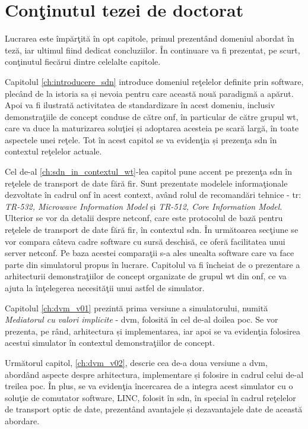 \section{Conţinutul tezei de doctorat}

Lucrarea este împărţită în opt capitole, primul prezentând domeniul abordat în teză, iar ultimul fiind dedicat concluziilor. În continuare va fi prezentat, pe scurt, conţinutul fiecărui dintre celelalte capitole.

Capitolul \ref{ch:introducere_sdn} introduce domeniul reţelelor definite prin software, plecând de la istoria sa și nevoia pentru care această nouă paradigmă a apărut. Apoi va fi ilustrată activitatea de standardizare în acest domeniu, inclusiv demonstraţiile de concept conduse de către \gls{onf}, în particular de către grupul \gls{wt}, care va duce la maturizarea soluţiei și adoptarea acesteia pe scară largă, în toate aspectele unei reţele. Tot în acest capitol se va evidenţia și prezenţa \gls{sdn} în contextul reţelelor actuale.

Cel de-al \ref{ch:sdn_in_contextul_wt}-lea capitol pune accent pe prezenţa \gls{sdn} în reţelele de transport de date fără fir. Sunt prezentate modelele informaţionale dezvoltate în cadrul \gls{onf} în acest context, având rolul de recomandări tehnice - \gls{tr}: \textit{TR-532, Microwave Information Model} și \textit{TR-512, Core Information Model}. Ulterior se vor da detalii despre \gls{netconf}, care este protocolul de bază pentru reţelele de transport de date fără fir, în contextul \gls{sdn}. În următoarea secţiune se vor compara câteva cadre software cu sursă deschisă, ce oferă facilitatea unui server \gls{netconf}. Pe baza acestei comparaţii s-a ales unealta software care va face parte din simulatorul propus în lucrare. Capitolul va fi încheiat de o prezentare a arhitecturii demonstraţiilor de concept organizate de grupul \gls{wt} din \gls{onf}, ce va ajuta la înţelegerea necesităţii unui astfel de simulator.

Capitolul \ref{ch:dvm_v01} prezintă prima versiune a simulatorului, numită \textit{Mediatorul cu valori implicite} - \gls{dvm}, folosită în cel de-al doilea \gls{poc}. Se vor prezenta, pe rând, arhitectura și implementarea, iar apoi se va evidenţia folosirea acestui simulator în contextul demonstraţiilor de concept.

Următorul capitol, \ref{ch:dvm_v02}, descrie cea de-a doua versiune a \gls{dvm}, abordând aspecte despre arhitectura, implementare și folosire in cadrul celui de-al treilea \gls{poc}. În plus, se va evidenţia încercarea de a integra acest simulator cu o soluţie de comutator software, LINC, folosit în \gls{sdn}, în special în cadrul reţelelor de transport optic de date, prezentând avantajele și dezavantajele date de această abordare.

